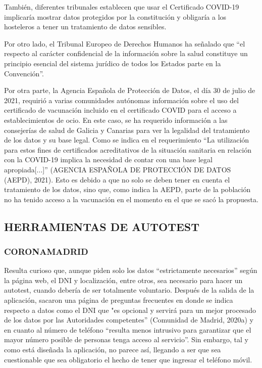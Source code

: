 \documentclass[11pt,a4paper,spanish]{article}
\begin{document}
También, diferentes tribunales establecen que usar el Certificado COVID-19 implicaría mostrar datos protegidos por la constitución y obligaría a los hosteleros a tener un tratamiento de datos sensibles.

Por otro lado, el Tribunal Europeo de Derechos Humanos ha señalado que “el respecto al carácter confidencial de la información sobre la salud constituye un principio esencial del sistema jurídico de todos los Estados parte en la Convención”.

Por otra parte, la Agencia Española de Protección de Datos, el día 30 de julio de 2021, requirió a varias comunidades autónomas información sobre el uso del certificado de vacunación incluido en el certificado COVID para el acceso a establecimientos de ocio. En este caso, se ha requerido información a las consejerías de salud de Galicia y Canarias para ver la legalidad del tratamiento de los datos y su base legal. Como se indica en el requerimiento “La utilización para estos fines de certificados acreditativos de la situación sanitaria en relación con la COVID-19 implica la necesidad de contar con una base legal apropiada[...]” (AGENCIA ESPAÑOLA DE PROTECCIÓN DE DATOS (AEPD), 2021). Esto es debido a que no solo se deben tener en cuenta el tratamiento de los datos, sino que, como indica la AEPD, parte de la población no ha tenido acceso a la vacunación en el momento en el que se sacó la propuesta.

\subsection{HERRAMIENTAS DE AUTOTEST}

\subsubsection{CORONAMADRID}

Resulta curioso que, aunque piden solo los datos “estrictamente necesarios” según la página web, el DNI y localización, entre otros, sea necesario para hacer un autotest, cuando debería de ser totalmente voluntario. Después de la salida de la aplicación, sacaron una página de preguntas frecuentes en donde se indica respecto a datos como el DNI que "es opcional y servirá para un mejor procesado de los datos por las Autoridades competentes” (Comunidad de Madrid, 2020a) y en cuanto al número de teléfono “resulta menos intrusivo para garantizar que el mayor número posible de personas tenga acceso al servicio”. Sin embargo, tal y como está diseñada la aplicación, no parece así, llegando a ser que sea cuestionable que sea obligatorio el hecho de tener que ingresar el teléfono móvil.
\end{document}
